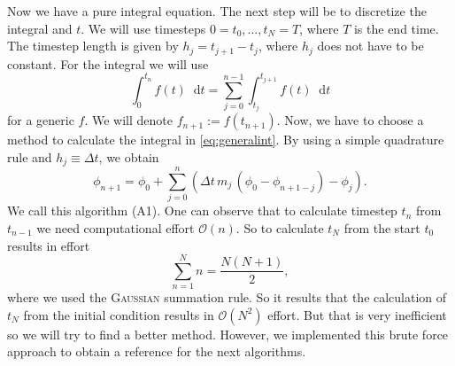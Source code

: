 \documentclass[12pt,a4paper,twoside, open=right]{scrreprt}
\theoremstyle{definition}
\theoremstyle{plain}
\newcommand{\D}{\mathop{}\!\mathrm{d}}
\begin{document}
Now we have a pure integral equation. The next step will be to discretize the integral and $t$.
We will use timesteps $0=t_0,\dotsc,t_N=T$, where $T$ is the end time. The timestep length is given by $h_j=t_{j+1}-t_j$, where $h_j$ does not have to be constant. For the integral we will use 
\begin{equation}
    \int_0^{t_n}f(t)\D t=\sum_{j=0}^{n-1}\int_{t_j}^{t_{j+1}}f(t)\D t\label{eq:generalint}
\end{equation}
for a generic $f$. We will denote $f_{n+1}:=f(t_{n+1})$. Now, we have to choose a method to calculate the integral in \eqref{eq:generalint}. By using a simple quadrature rule and $h_j\equiv \Delta t$, we obtain
\begin{equation}
    \phi_{n+1}=\phi_0 + \sum_{j=0}^{n}\left(\Delta t\, m_j\,(\phi_0-\phi_{n+1-j})-\phi_j\right).
\end{equation} We call this algorithm (A1).
One can observe that to calculate timestep $t_n$ from $t_{n-1}$ we need computational effort $\mathcal{O}(n)$. So to calculate $t_N$ from the start $t_0$ results in effort
\begin{equation}
    \sum_{n=1}^Nn=\frac{N(N+1)}{2},
\end{equation}
where we used the \textsc{Gaussian} summation rule. So it results that the calculation of $t_N$ from the initial condition results in $\mathcal{O}(N^2)$ effort.
But that is very inefficient so we will try to find a better method. However, we implemented this brute force approach to obtain a reference for the next algorithms.
\end{document}
